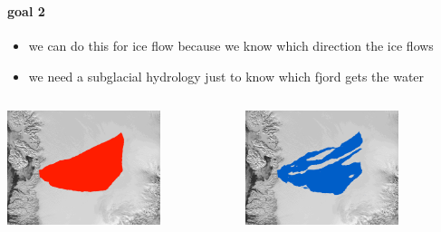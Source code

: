\documentclass[hide notes,intlimits]{beamer}
\begin{document}
\begin{frame}
  \frametitle{\goaltitle}
  \framesubtitle{goal 2}
 
\begin{center}
\end{center}
  
  \begin{itemize}
    \item we can do this for ice flow because we know which direction the ice flows
    \item we need a subglacial hydrology just to know which fjord gets the water
  \end{itemize}

\begin{columns}
\begin{column}{0.5\textwidth}
\includegraphics[width=0.7\textwidth]{figs/ftt-mask}
\end{column}
\begin{column}{0.5\textwidth}
\includegraphics[width=0.7\textwidth]{figs/hydro-mask}
\end{column}
\end{columns}


\end{frame}
\end{document}
